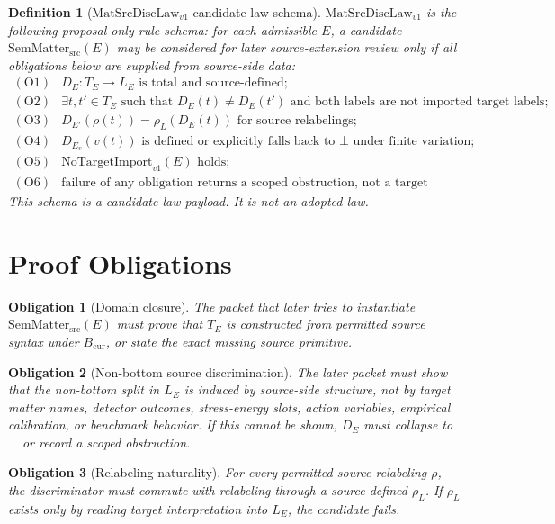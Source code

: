 \documentclass[11pt]{article}
\newtheorem{definition}{Definition}
\newtheorem{obligation}{Obligation}
\newcommand{\Bcur}{B_{\mathrm{cur}}}
\newcommand{\MatSrcDiscLaw}{\mathrm{MatSrcDiscLaw}_{v1}}
\newcommand{\SemMatterSrc}{\mathrm{SemMatter}_{\mathrm{src}}}
\newcommand{\NoTarget}{\mathrm{NoTargetImport}_{v1}}
\newcommand{\Bottom}{\bot}
\begin{document}
\begin{definition}[\(\MatSrcDiscLaw\) candidate-law schema]
\(\MatSrcDiscLaw\) is the following proposal-only rule schema:
for each admissible \(E\), a candidate \(\SemMatterSrc(E)\) may be considered
for later source-extension review only if all obligations below are supplied
from source-side data:
\[
\begin{array}{ll}
\mathrm{(O1)} & D_E:T_E\to L_E \text{ is total and source-defined};\\
\mathrm{(O2)} & \exists t,t'\in T_E \text{ such that } D_E(t)\neq D_E(t')
                 \text{ and both labels are not imported target labels};\\
\mathrm{(O3)} & D_{E'}(\rho(t))=\rho_L(D_E(t)) \text{ for source relabelings};\\
\mathrm{(O4)} & D_{E_v}(v(t)) \text{ is defined or explicitly falls back to }
                 \Bottom \text{ under finite variation};\\
\mathrm{(O5)} & \NoTarget(E) \text{ holds};\\
\mathrm{(O6)} & \text{failure of any obligation returns a scoped obstruction,
                 not a target import.}
\end{array}
\]
This schema is a candidate-law payload.  It is not an adopted law.
\end{definition}

\section{Proof Obligations}

\begin{obligation}[Domain closure]
The packet that later tries to instantiate \(\SemMatterSrc(E)\) must prove
that \(T_E\) is constructed from permitted source syntax under \(\Bcur\), or
state the exact missing source primitive.
\end{obligation}

\begin{obligation}[Non-bottom source discrimination]
The later packet must show that the non-bottom split in \(L_E\) is induced by
source-side structure, not by target matter names, detector outcomes,
stress-energy slots, action variables, empirical calibration, or benchmark
behavior.  If this cannot be shown, \(D_E\) must collapse to \(\Bottom\) or
record a scoped obstruction.
\end{obligation}

\begin{obligation}[Relabeling naturality]
For every permitted source relabeling \(\rho\), the discriminator must commute
with relabeling through a source-defined \(\rho_L\).  If \(\rho_L\) exists only
by reading target interpretation into \(L_E\), the candidate fails.
\end{obligation}
\end{document}
